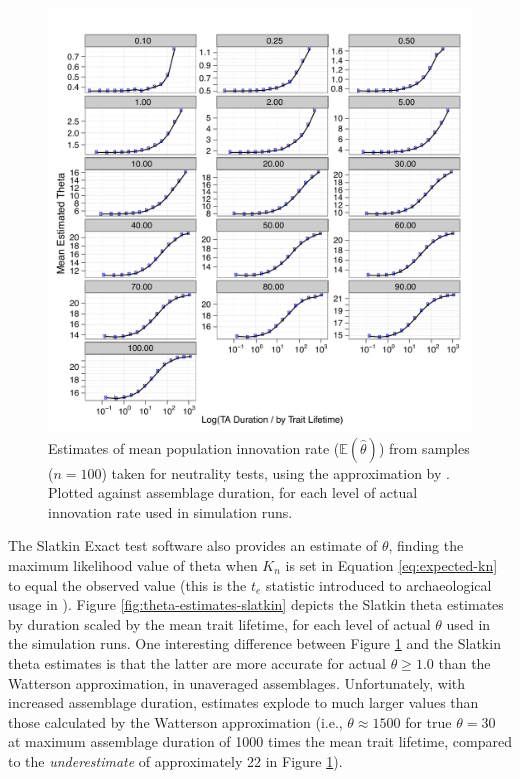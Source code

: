 \begin{figure}
	\includegraphics[scale=0.85]{graphics/timeaveraging/theta-estimates-scaled-MTL-theta-01-100.pdf}
	\caption{Estimates of mean population innovation rate ($\mathbb{E}(\hat{\theta})$) from samples ($n = 100$) taken for neutrality tests, using the approximation by \citet{watterson1975number}.  Plotted against assemblage duration, for each level of actual innovation rate used in simulation runs. }
	\label{fig:theta-estimates}
\end{figure}

The Slatkin Exact test software also provides an estimate of $\theta$, finding the maximum likelihood value of theta when $K_n$ is set in Equation \ref{eq:expected-kn} to equal the observed value (this is the $t_e$ statistic introduced to archaeological usage in \citealp{Neiman1995}).  Figure \ref{fig:theta-estimates-slatkin} depicts the Slatkin theta estimates by \timeav duration scaled by the mean trait lifetime, for each level of actual $\theta$ used in the simulation runs.  One interesting difference between Figure \ref{fig:theta-estimates} and the Slatkin theta estimates is that the latter are more accurate for actual $\theta \geq 1.0$ than the Watterson approximation, in unaveraged assemblages.  Unfortunately, with increased assemblage duration, estimates explode to much larger values than those calculated by the Watterson approximation (i.e., $\theta \approx 1500$ for true $\theta = 30$ at maximum assemblage duration of 1000 times the mean trait lifetime, compared to the \emph{underestimate} of approximately 22 in Figure \ref{fig:theta-estimates}). 

